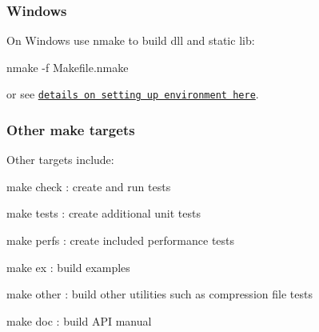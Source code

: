 \subsubsection*{Windows}

On Windows use nmake to build dll and static lib\-: \begin{DoxyVerb}nmake -f Makefile.nmake
\end{DoxyVerb}


or see \href{doc/build.md}{\tt details on setting up environment here}.

\subsubsection*{Other make targets}

Other targets include\-:
\begin{DoxyItemize}
\item {\ttfamily make check} \-: create and run tests
\item {\ttfamily make tests} \-: create additional unit tests
\item {\ttfamily make perfs} \-: create included performance tests
\item {\ttfamily make ex} \-: build examples
\item {\ttfamily make other} \-: build other utilities such as compression file tests
\item {\ttfamily make doc} \-: build A\-P\-I manual 
\end{DoxyItemize}